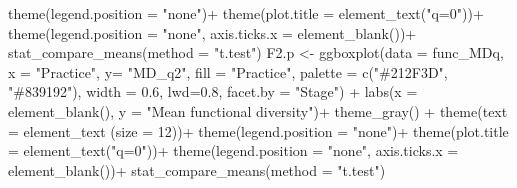 \documentclass[]{interact}
\theoremstyle{plain}%
\theoremstyle{definition}
\theoremstyle{remark}
\newenvironment{Shaded}{\begin{snugshade}}{\end{snugshade}}
\newcommand{\AttributeTok}[1]{\textcolor[rgb]{0.77,0.63,0.00}{#1}}
\newcommand{\DecValTok}[1]{\textcolor[rgb]{0.00,0.00,0.81}{#1}}
\newcommand{\FloatTok}[1]{\textcolor[rgb]{0.00,0.00,0.81}{#1}}
\newcommand{\FunctionTok}[1]{\textcolor[rgb]{0.00,0.00,0.00}{#1}}
\newcommand{\NormalTok}[1]{#1}
\newcommand{\OtherTok}[1]{\textcolor[rgb]{0.56,0.35,0.01}{#1}}
\newcommand{\SpecialCharTok}[1]{\textcolor[rgb]{0.00,0.00,0.00}{#1}}
\newcommand{\StringTok}[1]{\textcolor[rgb]{0.31,0.60,0.02}{#1}}
\begin{document}
\begin{Shaded}
\begin{Highlighting}[]
  \FunctionTok{theme}\NormalTok{(}\AttributeTok{legend.position =} \StringTok{"none"}\NormalTok{)}\SpecialCharTok{+}
  \FunctionTok{theme}\NormalTok{(}\AttributeTok{plot.title =} \FunctionTok{element\_text}\NormalTok{(}\StringTok{"q=0"}\NormalTok{))}\SpecialCharTok{+}
  \FunctionTok{theme}\NormalTok{(}\AttributeTok{legend.position =} \StringTok{"none"}\NormalTok{,}
        \AttributeTok{axis.ticks.x =} \FunctionTok{element\_blank}\NormalTok{())}\SpecialCharTok{+}
  \FunctionTok{stat\_compare\_means}\NormalTok{(}\AttributeTok{method =} \StringTok{"t.test"}\NormalTok{)}
\NormalTok{F2.p }\OtherTok{\textless{}{-}} \FunctionTok{ggboxplot}\NormalTok{(}\AttributeTok{data =}\NormalTok{ func\_MDq, }\AttributeTok{x =} \StringTok{"Practice"}\NormalTok{, }\AttributeTok{y=} \StringTok{"MD\_q2"}\NormalTok{,}
                  \AttributeTok{fill =} \StringTok{"Practice"}\NormalTok{, }\AttributeTok{palette =} \FunctionTok{c}\NormalTok{(}\StringTok{"\#212F3D"}\NormalTok{, }\StringTok{"\#839192"}\NormalTok{), }
                  \AttributeTok{width =} \FloatTok{0.6}\NormalTok{, }\AttributeTok{lwd=}\FloatTok{0.8}\NormalTok{, }\AttributeTok{facet.by =} \StringTok{"Stage"}\NormalTok{)  }\SpecialCharTok{+}
  \FunctionTok{labs}\NormalTok{(}\AttributeTok{x =} \FunctionTok{element\_blank}\NormalTok{(), }\AttributeTok{y =} \StringTok{"Mean functional diversity"}\NormalTok{)}\SpecialCharTok{+}
  \FunctionTok{theme\_gray}\NormalTok{() }\SpecialCharTok{+}
  \FunctionTok{theme}\NormalTok{(}\AttributeTok{text =} \FunctionTok{element\_text}\NormalTok{ (}\AttributeTok{size =} \DecValTok{12}\NormalTok{))}\SpecialCharTok{+}
  \FunctionTok{theme}\NormalTok{(}\AttributeTok{legend.position =} \StringTok{"none"}\NormalTok{)}\SpecialCharTok{+}
  \FunctionTok{theme}\NormalTok{(}\AttributeTok{plot.title =} \FunctionTok{element\_text}\NormalTok{(}\StringTok{"q=0"}\NormalTok{))}\SpecialCharTok{+}
  \FunctionTok{theme}\NormalTok{(}\AttributeTok{legend.position =} \StringTok{"none"}\NormalTok{,}
        \AttributeTok{axis.ticks.x =} \FunctionTok{element\_blank}\NormalTok{())}\SpecialCharTok{+}
  \FunctionTok{stat\_compare\_means}\NormalTok{(}\AttributeTok{method =} \StringTok{"t.test"}\NormalTok{)}
        

\end{Highlighting}
\end{Shaded}
\end{document}
